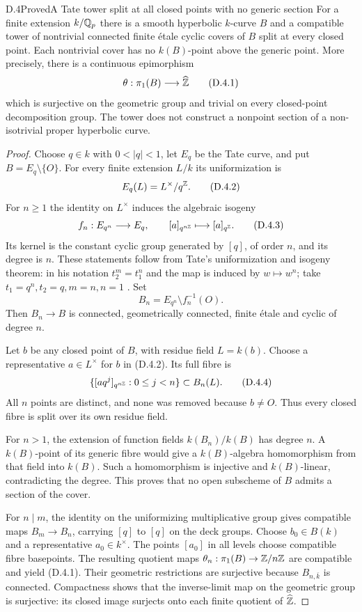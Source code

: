\begin{statement}{D.4}{Proved}{A Tate tower split at all closed points with no generic section}
For a finite extension $k/\mathbb Q_p$ there is a smooth hyperbolic
$k$-curve $B$ and a compatible tower of nontrivial connected
finite \'etale cyclic covers of $B$ split at every closed point.
Each nontrivial cover has no $k(B)$-point above the generic
point. More precisely, there is a continuous epimorphism
\[
 \theta:\pi_1(B)\longrightarrow\widehat{\mathbb Z}
 \tag{D.4.1}
\]
which is surjective on the geometric group and trivial on every
closed-point decomposition group. The tower does not construct
a nonpoint section of a non-isotrivial proper hyperbolic curve.
\end{statement}
\begin{proof}
Choose $q\in k$ with $0<|q|<1$, let $E_q$ be the Tate curve,
and put $B=E_q\setminus\{O\}$. For every finite extension
$L/k$ its uniformization is
\[
 E_q(L)=L^\times/q^{\mathbb Z}.
 \tag{D.4.2}
\]
For $n\ge1$ the identity on $L^\times$ induces the algebraic
isogeny
\[
 f_n:E_{q^n}\longrightarrow E_q,
 \qquad [a]_{q^{n\mathbb Z}}\longmapsto[a]_{q^\mathbb Z}.
 \tag{D.4.3}
\]
Its kernel is the constant cyclic group generated by $[q]$,
of order $n$, and its degree is $n$. These statements follow
from Tate's uniformization and isogeny theorem: in his notation
$t_2^m=t_1^n$ and the map is induced by $w\mapsto w^n$;
take $t_1=q^n,t_2=q,m=n,n=1$
\cite[Theorem 1 and the isogeny theorem on printed p.\ 16]{AgentTateUniformization}.
Set
\[
 B_n=E_{q^n}\setminus f_n^{-1}(O).
\]
Then $B_n\to B$ is connected, geometrically connected,
finite \'etale and cyclic of degree $n$.

Let $b$ be any closed point of $B$, with residue field
$L=k(b)$. Choose a representative $a\in L^\times$ for $b$
in (D.4.2). Its full fibre is
\[
 \{[a q^j]_{q^{n\mathbb Z}}:0\le j<n\}\subset B_n(L).
 \tag{D.4.4}
\]
All $n$ points are distinct, and none was removed because
$b\ne O$. Thus every closed fibre is split over its own
residue field.

For $n>1$, the extension of function fields
$k(B_n)/k(B)$ has degree $n$. A $k(B)$-point of its generic
fibre would give a $k(B)$-algebra homomorphism from that
field into $k(B)$. Such a homomorphism is injective and
$k(B)$-linear, contradicting the degree. This proves that
no open subscheme of $B$ admits a section of the cover.

For $n\mid m$, the identity on the uniformizing multiplicative
group gives compatible maps $B_m\to B_n$, carrying $[q]$
to $[q]$ on the deck groups. Choose $b_0\in B(k)$ and a
representative $a_0\in k^\times$. The points $[a_0]$ in all
levels choose compatible fibre basepoints. The resulting
quotient maps
$\theta_n:\pi_1(B)\to\mathbb Z/n\mathbb Z$ are compatible and yield
(D.4.1). Their geometric restrictions are surjective because
$B_{n,\bar k}$ is connected. Compactness shows that the
inverse-limit map on the geometric group is surjective: its
closed image surjects onto each finite quotient of
$\widehat{\mathbb Z}$.


\end{proof}
